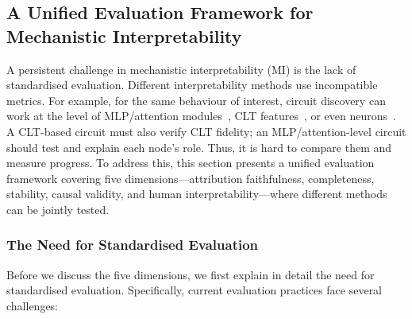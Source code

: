 \subsection{A Unified Evaluation Framework for Mechanistic Interpretability}
\label{sec:evaluation-framework}

A persistent challenge in mechanistic interpretability (MI) is the lack of standardised evaluation. Different interpretability methods use incompatible metrics. For example, for the same behaviour of interest, circuit discovery can work at the level of MLP/attention modules~, CLT features~, or even neurons~. A CLT-based circuit must also verify CLT fidelity; an MLP/attention-level circuit should test and explain each node's role. Thus, it is hard to compare them and measure progress. To address this, this section presents a unified evaluation framework covering five dimensions---attribution faithfulness, completeness, stability, causal validity, and human interpretability---where different methods can be jointly tested.

\subsubsection{The Need for Standardised Evaluation}

Before we discuss the five dimensions, we first explain in detail the need for standardised evaluation. Specifically, current evaluation practices face several challenges:

